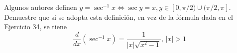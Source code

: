 \item Algunos autores definen $y = \sec^{-1} x \iff \sec y = x, y \in [0, \pi/2) \cup (\pi/2, \pi]$. Demuestre que si se adopta esta definición, en vez de la fórmula dada en el Ejercicio 34, se tiene
    $$\frac{d}{dx} (\sec^{-1} x) = \frac{1}{|x|\sqrt{x^2 - 1}}, \, |x| > 1$$
